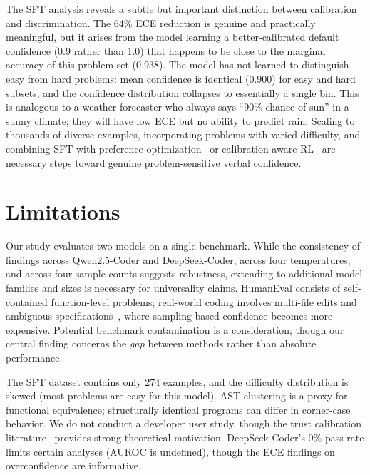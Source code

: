 \documentclass{article}
\begin{document}
The SFT analysis reveals a subtle but important distinction between calibration and discrimination. The 64\% ECE reduction is genuine and practically meaningful, but it arises from the model learning a better-calibrated default confidence (0.9 rather than 1.0) that happens to be close to the marginal accuracy of this problem set (0.938). The model has not learned to distinguish easy from hard problems: mean confidence is identical (0.900) for easy and hard subsets, and the confidence distribution collapses to essentially a single bin. This is analogous to a weather forecaster who always says ``90\% chance of sun'' in a sunny climate; they will have low ECE but no ability to predict rain. Scaling to thousands of diverse examples, incorporating problems with varied difficulty, and combining SFT with preference optimization~\citep{rafailov2023direct} or calibration-aware RL~\citep{stangel2025rewarding} are necessary steps toward genuine problem-sensitive verbal confidence.

\section{Limitations}
\label{sec:limitations}

Our study evaluates two models on a single benchmark. While the consistency of findings across Qwen2.5-Coder and DeepSeek-Coder, across four temperatures, and across four sample counts suggests robustness, extending to additional model families and sizes is necessary for universality claims. HumanEval consists of self-contained function-level problems; real-world coding involves multi-file edits and ambiguous specifications~\citep{jimenez2024swe}, where sampling-based confidence becomes more expensive. Potential benchmark contamination is a consideration, though our central finding concerns the \emph{gap} between methods rather than absolute performance.

The SFT dataset contains only 274 examples, and the difficulty distribution is skewed (most problems are easy for this model). AST clustering is a proxy for functional equivalence; structurally identical programs can differ in corner-case behavior. We do not conduct a developer user study, though the trust calibration literature~\citep{lee2004trust, yin2019understanding} provides strong theoretical motivation. DeepSeek-Coder's 0\% pass rate limits certain analyses (AUROC is undefined), though the ECE findings on overconfidence are informative.
\end{document}

